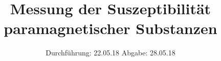 

\subject{V606}
\title{Messung der Suszeptibilität paramagnetischer Substanzen }
\date{
  Durchführung: 22.05.18
  \hspace{3em}
  Abgabe: 28.05.18
}



\maketitle
\thispagestyle{empty}
\tableofcontents
\newpage








\newpage
\printbibliography


